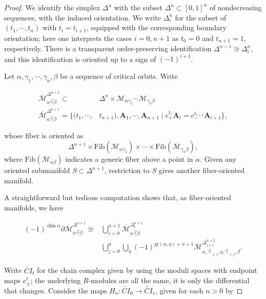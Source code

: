 \documentclass{memo-l}
\theoremstyle{definition}
\theoremstyle{remark}
\numberwithin{section}{chapter}
\numberwithin{equation}{chapter}
\begin{document}
\begin{proof}
We identify the simplex $\Delta^n$ with the subset $\Delta^n \subset [0,1]^n$ of nondecreasing sequences, with the induced orientation. We write $\Delta^n_i$ for the subset of $(t_1, \cdots, t_n)$ with $t_i = t_{i+1}$, equipped with the corresponding boundary orientation; here one interprets the cases $i = 0, n+1$ as $t_0 = 0$ and $t_{n+1} = 1$, respectively. There is a transparent order-preserving identification $\Delta^{n-1} \cong \Delta^n_i$, and this identification is oriented up to a sign of $(-1)^{i+1}$.

Let $\alpha, \gamma_1, \cdots, \gamma_n, \beta$ be a sequence of critical orbits. Write 

\begin{align*}\overline{\mathcal M}^{\Delta^{n+1}}_{\alpha \vec{\gamma} \beta} \subset &\Delta^n \times \mathcal M_{\alpha \gamma_1} \cdots \mathcal M_{\gamma_n \beta}\\
\overline{\mathcal M}^{\Delta^{n+1}}_{\alpha \vec{\gamma} \beta} = \{(t_1, \cdots, &t_{n+1}), \mathbf{A}_1, \cdots, \mathbf{A}_{n+1} \mid e_+^{t_i}\mathbf{A}_i = e_-^{t_{i+1}} \mathbf{A}_{i+1}\},
\end{align*}

whose fiber is oriented as $$\Delta^{n+1} \times \text{Fib}(\overline{\mathcal M}_{\alpha \gamma_1}) \times \cdots \times \text{Fib}(\overline{\mathcal M}_{\gamma_n \beta}),$$ where $\text{Fib}(\overline{\mathcal M}_{\alpha \beta})$ indicates a generic fiber above a point in $\alpha$. Given any oriented submanifold $S \subset \Delta^{n+1}$, restriction to $S$ gives another fiber-oriented manifold.

A straightforward but tedious computation shows that, as fiber-oriented manifolds, we have 

\begin{align*}(-1)^{\dim \alpha}\partial \overline{\mathcal M}^{\Delta^{n+1}}_{\alpha \vec{\gamma} \beta} \cong &\bigcup_{i=0}^{n+1} \overline{\mathcal M}^{\Delta^{n+1}_i}_{\alpha \vec{\gamma} \beta} \\
&\bigcup_{j=0}^n \bigcup_\eta (-1)^{\text{gr}(\alpha, \eta) + n+1} \overline{\mathcal M}^{\Delta^{n+2}_{j+1}}_{\alpha, \vec{\gamma}_{\leq j}, \eta, \vec{\gamma}_{>j}, \beta}.\end{align*}

Write $\widetilde{CI}_t$ for the chain complex given by using the moduli spaces with endpoint maps $e^t_\pm$; the underlying $R$-modules are all the same, it is only the differential that changes. Consider the maps $H_n: \widetilde{CI}_0 \to \widetilde{CI}_1$, given for each $n>0$ by


\end{proof}
\end{document}
